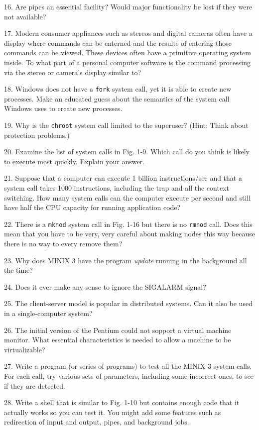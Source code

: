 \documentclass{book}
\newcommand {\sys} [1] {\textsl{#1}}
\newcommand {\cmd} [1] {\texttt{#1}}
\begin{document}
16. Are pipes an essential facility? Would major functionality be lost if they were not available?

17. Modern consumer appliances such as stereos and digital cameras often have a display 
where commands can be enterned and the results of entering those commands can be viewed.
These devices often have a primitive operating system inside.
To what part of a personal computer software is the command processing via the stereo or camera's display similar to?

18. Windows does not have a \cmd{fork} system call, yet it is able to create new processes.
Make an educated guess about the semantics of the system call Windows uses to create new processes.

19. Why is the \cmd{chroot} system call limited to the superuser? (Hint: Think about protection problems.)

20. Examine the list of system calls in Fig. 1-9.
Which call do you think is likely to execute most quickly.
Explain your answer.

21. Suppose that a computer can execute 1 billion instructions/sec and that a system call takes 1000 instructions,
including the trap and all the context switching.
How many system calls can the computer execute per second and still have half the CPU  capacity for running application code?

22. There is a \cmd{mknod} system call in Fig. 1-16 but there is no \cmd{rmnod} call.
Does this mean that you have to be very, very careful about making nodes this way because there is no way to every remove them?

23. Why does MINIX 3 have the program \sys{update} running in the background all the time?

24. Does it ever make any sense to ignore the SIGALARM signal?

25. The client-server model is popular in distributed systems.
Can it also be used in a single-computer system?

26. The initial version of the Pentium could not sopport a virtual machine monitor.
What essential characteristics is needed to allow a machine to be virtualizable?

27. Write a program (or series of programs) to test all the MINIX 3 system calls.
For each call, try various sets of parameters, including some incorrect ones, to see if they are detected.

28. Write a shell that is similar to Fig. 1-10 but contains enough code that it actually works so you can test it.
You might add some features such as redirection of input and output, pipes, and background jobs.
\end{document}
